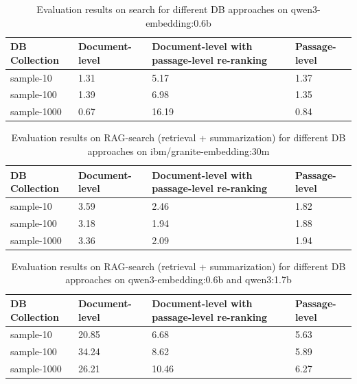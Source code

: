 \begin{table}[h]
  \centering
  \caption{Evaluation results on search for different DB approaches on qwen3-embedding:0.6b}
  \scriptsize
    \begin{tabularx}{\textwidth}{lYYY}
    \toprule
    \textbf{DB Collection} & \textbf{Document-level} &
    \textbf{Document-level with passage-level re-ranking} & \textbf{Passage-level} \\
    \midrule
    sample-10   & 1.31 & 5.17 & 1.37 \\
    sample-100  & 1.39 & 6.98 & 1.35 \\
    sample-1000 & 0.67 & 16.19 & 0.84 \\
    \bottomrule
  \end{tabularx}\label{tab:eval-22-results}
\end{table}

\begin{table}[h]
  \centering
    \caption{Evaluation results on RAG-search (retrieval + summarization) for different DB approaches on ibm/granite-embedding:30m}
  \scriptsize
    \begin{tabularx}{\textwidth}{lYYY}
    \toprule
    \textbf{DB Collection} & \textbf{Document-level} &
    \textbf{Document-level with passage-level re-ranking} & \textbf{Passage-level} \\
    \midrule
    sample-10   & 3.59 & 2.46 & 1.82 \\
    sample-100  & 3.18 & 1.94 & 1.88 \\
    sample-1000 & 3.36 & 2.09 & 1.94 \\
    \bottomrule
  \end{tabularx}\label{tab:eval-31-results}
\end{table}

\begin{table}[h]
  \centering
    \caption{Evaluation results on RAG-search (retrieval + summarization) for different DB approaches on qwen3-embedding:0.6b and qwen3:1.7b}
  \scriptsize
    \begin{tabularx}{\textwidth}{lYYY}
    \toprule
    \textbf{DB Collection} & \textbf{Document-level} &
    \textbf{Document-level with passage-level re-ranking} & \textbf{Passage-level} \\
    \midrule
    sample-10   & 20.85 & 6.68 & 5.63 \\
    sample-100  & 34.24 & 8.62 & 5.89 \\
    sample-1000 & 26.21 & 10.46 & 6.27 \\
    \bottomrule
  \end{tabularx}\label{tab:eval-32-results}
\end{table}

